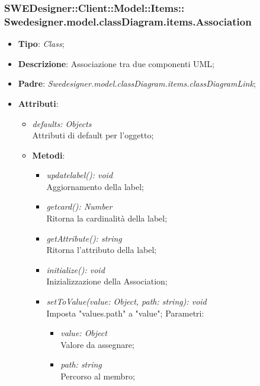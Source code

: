 \documentclass[../DefinizioneDiProdotto.tex]{subfiles}
\begin{document}
			\subsubsection[Swedesigner.model.classDiagram.items.Association]{SWEDesigner::Client::Model::Items::\\Swedesigner.model.classDiagram.items.Association}
			\hypertarget{SWEDesigner::Client::Model::Items::Swedesigner.model.classDiagram.items.Association}{}
			\begin{itemize}
				\item \textbf{Tipo}: \emph{Class};
				\item \textbf{Descrizione}: Associazione tra due componenti UML;
				\item \textbf{Padre}: \emph{Swedesigner.model.classDiagram.items.classDiagramLink};
				\item \textbf{Attributi}:
				\begin{itemize}
					\item \emph{defaults: Objects}\\
					Attributi di default per l'oggetto;
					\item \textbf{Metodi}:
					\begin{itemize}
						\item \emph{updatelabel(): void}\\
						Aggiornamento della label;
						\item \emph{getcard(): Number}\\
						Ritorna la cardinalità della label;
						\item \emph{getAttribute(): string}\\
						Ritorna l'attributo della label;
						\item \emph{initialize(): void}\\
						Inizializzazione della Association;
						\item \emph{setToValue(value: Object, path: string): void}\\
						Imposta "values.path" a "value";
						Parametri:
						\begin{itemize}
							\item \emph{value: Object} \\
							Valore da assegnare;
							\item \emph{path: string} \\
							Percorso al membro;
						\end{itemize}
					\end{itemize}
				\end{itemize}
			\end{itemize}
			
\end{document}
